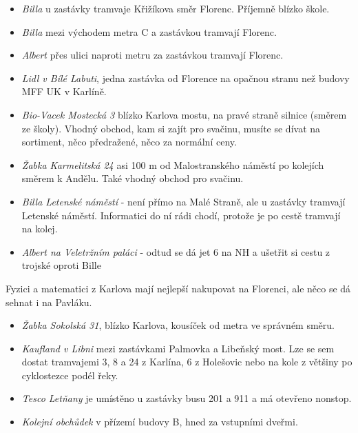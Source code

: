 \begin{itemize}
\item \textit{Billa} u zastávky tramvaje Křižíkova směr Florenc. Příjemně blízko
škole.
\item \textit{Billa} mezi východem metra C a zastávkou tramvají Florenc.
\item \textit{Albert} přes ulici naproti metru za zastávkou tramvají Florenc.
\item \textit{Lidl v Bílé Labuti}, jedna zastávka od Florence na opačnou stranu
než budovy MFF UK v Karlíně.
\end{itemize}

\begin{itemize}
\item \textit{Bio-Vacek Mostecká 3} blízko Karlova mostu, na pravé straně
silnice (směrem ze školy). Vhodný obchod, kam si zajít pro svačinu, musíte se
dívat na sortiment, něco předražené, něco za normální ceny.
\item \textit{Žabka Karmelitská 24} asi 100 m od Malostranského náměstí po
kolejích směrem k Andělu. Také vhodný obchod pro svačinu.
\item \textit{Billa Letenské náměstí} - není přímo na Malé Straně, ale u
zastávky tramvají Letenské náměstí. Informatici do ní rádi chodí, protože je po
cestě tramvají na kolej.
\item \textit{Albert na Veletržním paláci} - odtud se dá jet 6 na NH
a ušetřit si cestu z trojské oproti Bille

\end{itemize}

Fyzici a matematici z Karlova mají nejlepší nakupovat na Florenci, ale něco se
dá sehnat i na Pavláku.
\begin{itemize}
\item \textit{Žabka Sokolská 31}, blízko Karlova, kousíček od metra ve správném
směru.
\end{itemize}

\begin{itemize}
\item \textit{Kaufland v Libni} mezi zastávkami Palmovka a Libeňský most. Lze se
sem dostat tramvajemi 3, 8 a 24 z Karlína, 6 z Holešovic nebo na kole z většiny
po cyklostezce podél řeky.
\item \textit{Tesco Letňany} je umístěno u zastávky busu 201 a 911 a má otevřeno
nonstop.
\item \textit{Kolejní obchůdek} v přízemí budovy B, hned za vstupními dveřmi.
\end{itemize}

